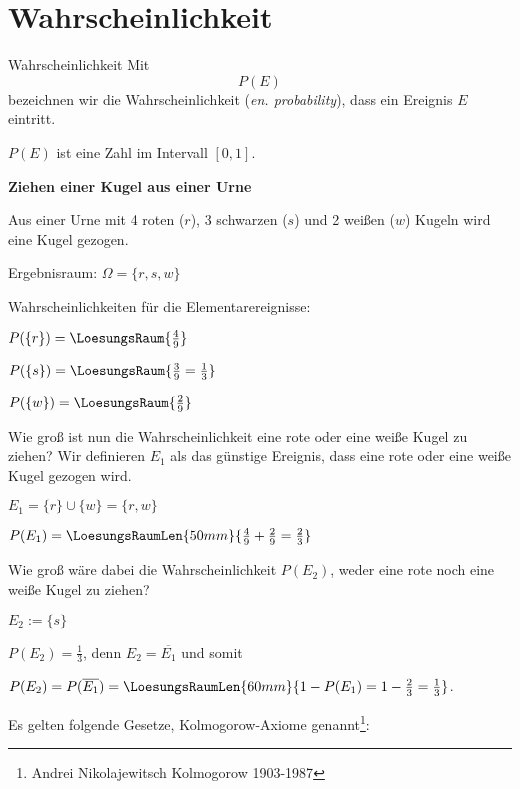 
\section{Wahrscheinlichkeit}
\begin{definition}{Wahrscheinlichkeit}{}
Mit $$P(E)$$ bezeichnen wir die Wahrscheinlichkeit (\textit{en. probability}), dass ein Ereignis $E$ eintritt.

$P(E)$ ist eine Zahl im Intervall $[0,1]$.
\end{definition}

\begin{beispiel}{}{}\textbf{Ziehen einer Kugel aus einer Urne}

Aus einer Urne mit 4 roten ($r$), 3 schwarzen ($s$) und 2 weißen ($w$) Kugeln wird eine Kugel gezogen.

Ergebnisraum: $\Omega = \{r, s, w\}$


Wahrscheinlichkeiten für die Elementarereignisse:

\noTRAINER{\leserluft\leserluft}
$P(\{r\}) = \LoesungsRaum{\frac49}$

\noTRAINER{\leserluft\leserluft}
$P(\{s\}) = \LoesungsRaum{\frac39 = \frac13}$

\noTRAINER{\leserluft\leserluft}
$P(\{w\}) = \LoesungsRaum{\frac29}$

Wie groß ist nun die Wahrscheinlichkeit eine rote oder eine weiße Kugel zu ziehen?
Wir definieren $E_1$ als das günstige Ereignis, dass eine rote oder eine weiße Kugel gezogen wird.

$E_1 = \{r\} \cup \{w\} = \{r,w\}$

\noTRAINER{\leserluft\leserluft}
$P(E_1) = \LoesungsRaumLen{50mm}{\frac49 + \frac29 = \frac23}$


Wie groß wäre dabei die Wahrscheinlichkeit $P(E_2)$, weder eine rote noch eine weiße Kugel zu ziehen?

$E_2 := \{s\}$

$P(E_2) = \frac13$, denn $E_2 = \overline{E_1}$ und somit

\noTRAINER{\leserluft\leserluft}
$P(E_2) = P(\overline{E_1}) = \LoesungsRaumLen{60mm}{1 - P(E_1) = 1 - \frac23 = \frac13}$.

\end{beispiel}
\newpage


Es gelten folgende Gesetze, Kolmogorow-Axiome genannt\footnote{Andrei Nikolajewitsch
  Kolmogorow 1903-1987}:

